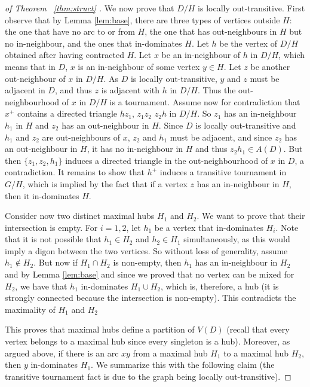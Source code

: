 \begin{proof}[of Theorem ~\ref{thm:struct} ]
We now prove that $D/H$ is locally out-transitive.
First observe that by Lemma \ref{lem:base},  there are three types of vertices outside $H$: the one that have no arc to or from $H$, the one that has out-neighbours in $H$ but no in-neighbour, and the ones that in-dominates $H$. 
 Let $h$ be the vertex of $D/H$ obtained after having contracted $H$. 
Let $x$ be an in-neighbour of $h$ in $D/H$, which means that in $D$, $x$ is an in-neighbour of some vertex $y \in H$. Let $z$ be another out-neighbour of $x$ in $D/H$. As $D$ is locally out-transitive, $y$ and $z$ must be adjacent in $D$, and thus $z$ is adjacent with $h$ in $D/H$. Thus the out-neighbourhood of $x$ in $D/H$ is a tournament.  
Assume now for contradiction that $x^+$ contains a directed triangle $hz_1$, $z_1z_2$ $z_2h$ in $D/H$. 
So $z_1$ has an in-neighbour $h_1$ in $H$ and $z_2$ has an out-neighbour in $H$. 
Since $D$ is locally out-transitive and $h_1$ and $z_2$ are out-neighbours of $x$, $z_2$ and $h_1$ must be adjacent, and since $z_2$ has an out-neighbour in $H$, it has no in-neighbour in $H$ and thus $z_2h_1 \in A(D)$. 
But then $\{z_1, z_2, h_1\}$ induces a directed triangle in the out-neighbourhood of $x$ in $D$, a contradiction. 
It remains to show that $h^+$ induces a transitive tournament in $G/H$, which is implied by the fact that if a vertex $z$ has an in-neighbour in $H$, then it in-dominates $H$. 
\medskip

Consider now two distinct maximal hubs $H_{1}$ and $H_{2}$. We want to prove that their intersection is empty. For $i=1,2$, let $h_1$ be a vertex that in-dominates $H_i$. Note that it is not possible that $h_1\in H_2$ and $h_2\in H_1$ simultaneously, as this would imply a digon between the two vertices. So without loss of generality, assume $h_1\notin H_2$. But now if $H_1\cap H_2 $ is non-empty, then $h_1$ has an in-neighbour in $H_2$ and by Lemma \ref{lem:base} and since we proved that no vertex can be mixed for $H_2$, we have that $h_1$ in-dominates $H_{1}\cup H_{2}$, which is, therefore, a hub (it is strongly connected because the intersection is non-empty). This contradicts the maximality of $H_1$ and $H_2$ 

This proves that maximal hubs define a partition of $V(D)$ (recall that every vertex belongs to a maximal hub since every singleton is a hub). Moreover, as argued above, if there is an arc $xy$ from a maximal hub $H_{1}$ to a maximal hub $H_{2}$, then $y$ in-dominates $H_{1}$. We summarize this with the following claim (the transitive tournament fact is due to the graph being locally out-transitive).


\end{proof}
